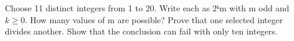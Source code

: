 \documentclass[11pt]{article}
\begin{document}
Choose 11 distinct integers from 1 to 20. Write each as 2ᵏm with m odd and \(k \geq  0\). How many values of m are possible? Prove that one selected integer divides another. Show that the conclusion can fail with only ten integers.\par
\vspace{5pt}
\end{document}
